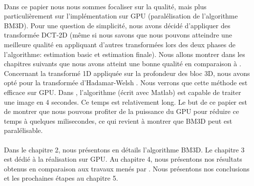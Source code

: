 \paragraph{}
Dans ce papier nous nous sommes focaliser sur la qualité, mais plus particulièrement sur l'implémentation sur GPU (paralélisation de l'algorithme BM3D). Pour une question de simplicité, nous avons décidé d'appliquer des transformée DCT-2D (même si nous savons que nous pouvons atteindre une meilleure qualité en appliquant d'autres transformées lors des deux phases de l'algorithme: estimation basic et estimation finale). Nous allons montrer dans les chapitres suivants que nous avons atteint une bonne qualité en comparaison à \cite{3}. Concernant la transformé 1D appliquée sur la profondeur des bloc 3D, nous avons opté pour la transformée d'Hadamar-Welsh \cite{4}. Nous verrons que cette méthode est efficace sur GPU. Dans \cite{1}, l'algorithme (écrit avec Matlab) est capable de traiter une image en 4 secondes. Ce temps est relativement long. Le but de ce papier est  de montrer que nous pouvons profiter de la puissance du GPU pour  réduire ce temps à quelques milisecondes, ce qui revient à montrer que BM3D peut est paralélisable.   
\paragraph{}
Dans le chapitre 2, nous présentons en détails l'algorithme BM3D. Le chapitre 3 est dédié à la réalisation sur GPU. Au chapitre 4, nous présentons nos résultats obtenus en comparaison aux travaux menés par \cite{3}. Nous présentons nos conclusions et les prochaines étapes au chapitre  5.     